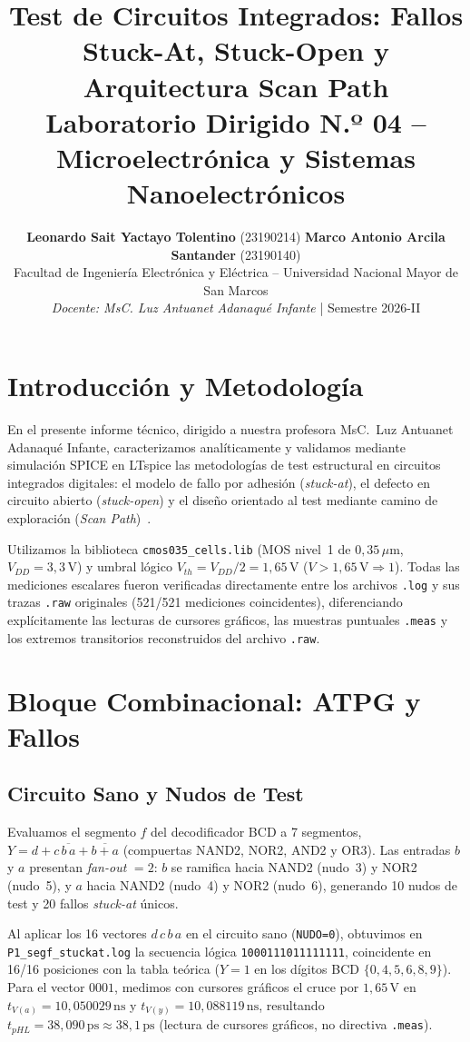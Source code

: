 \documentclass[10pt,twocolumn]{article}
\title{\vspace{-12pt}\textbf{\large Test de Circuitos Integrados: Fallos Stuck-At, Stuck-Open y Arquitectura Scan Path}\texorpdfstring{\\[2pt]}{ -- }
\normalsize Laboratorio Dirigido N.º 04 -- Microelectrónica y Sistemas Nanoelectrónicos}
\author{\small\textbf{Leonardo Sait Yactayo Tolentino} (23190214) \quad \textbf{Marco Antonio Arcila Santander} (23190140)\texorpdfstring{\\}{, }
\footnotesize Facultad de Ingeniería Electrónica y Eléctrica -- Universidad Nacional Mayor de San Marcos\texorpdfstring{\\}{, }
\footnotesize \textit{Docente: MsC. Luz Antuanet Adanaqué Infante} \quad | \quad Semestre 2026-II\vspace{-8pt}}
\date{}
\begin{document}
\renewcommand{\tablename}{Tabla}
\maketitle
\vspace{-10pt}

\section{Introducción y Metodología}
En el presente informe técnico, dirigido a nuestra profesora MsC.\ Luz Antuanet Adanaqué Infante, caracterizamos analíticamente y validamos mediante simulación SPICE en LTspice las metodologías de test estructural en circuitos integrados digitales: el modelo de fallo por adhesión (\emph{stuck-at}), el defecto en circuito abierto (\emph{stuck-open}) y el diseño orientado al test mediante camino de exploración (\emph{Scan Path})~\cite{guia,bushnell}.

Utilizamos la biblioteca \texttt{cmos035\_cells.lib} (MOS nivel~1 de $0{,}35\,\mu\mathrm{m}$, $V_{DD}=3{,}3\,\mathrm{V}$) y umbral lógico $V_{th}=V_{DD}/2=1{,}65\,\mathrm{V}$ ($V>1{,}65\,\mathrm{V} \Rightarrow 1$). Todas las mediciones escalares fueron verificadas directamente entre los archivos \texttt{.log} y sus trazas \texttt{.raw} originales (521/521 mediciones coincidentes), diferenciando explícitamente las lecturas de cursores gráficos, las muestras puntuales \texttt{.meas} y los extremos transitorios reconstruidos del archivo \texttt{.raw}.

\section{Bloque Combinacional: ATPG y Fallos}
\subsection{Circuito Sano y Nudos de Test}
Evaluamos el segmento $f$ del decodificador BCD a 7 segmentos, $Y = d + c\,\overline{b\,a} + \overline{b+a}$ (compuertas NAND2, NOR2, AND2 y OR3). Las entradas $b$ y $a$ presentan \emph{fan-out} $=2$: $b$ se ramifica hacia NAND2 (nudo~3) y NOR2 (nudo~5), y $a$ hacia NAND2 (nudo~4) y NOR2 (nudo~6), generando 10 nudos de test y 20 fallos \emph{stuck-at} únicos.

Al aplicar los 16 vectores $d\,c\,b\,a$ en el circuito sano (\texttt{NUDO=0}), obtuvimos en \texttt{P1\_segf\_stuckat.log} la secuencia lógica \texttt{1000111011111111}, coincidente en 16/16 posiciones con la tabla teórica ($Y=1$ en los dígitos BCD $\{0,4,5,6,8,9\}$). Para el vector $0001$, medimos con cursores gráficos el cruce por $1{,}65\,\mathrm{V}$ en $t_{V(a)}=10{,}050029\,\mathrm{ns}$ y $t_{V(y)}=10{,}088119\,\mathrm{ns}$, resultando $t_{pHL}=38{,}090\,\mathrm{ps}\approx 38{,}1\,\mathrm{ps}$ (lectura de cursores gráficos, no directiva \texttt{.meas}).
\end{document}
